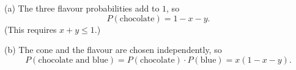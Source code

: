 (a) The three flavour probabilities add to $1$, so
\[P(\text{chocolate})=\boxed{1-x-y}.\]
(This requires $x+y\le1$.)

(b) The cone and the flavour are chosen independently, so
\[P(\text{chocolate and blue})=P(\text{chocolate})\cdot P(\text{blue})=\boxed{x(1-x-y)}.\]
